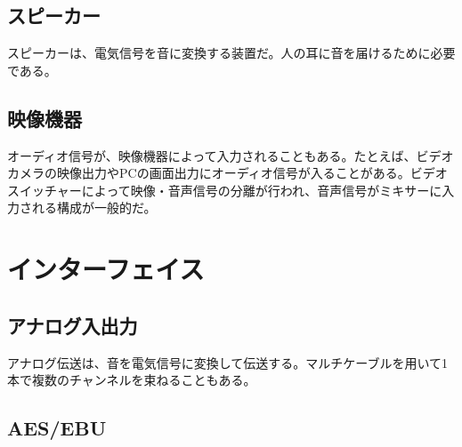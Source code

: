 \subsection{スピーカー}

スピーカーは、電気信号を音に変換する装置だ。人の耳に音を届けるために必要である。


\subsection{映像機器}

オーディオ信号が、映像機器によって入力されることもある。たとえば、ビデオカメラの映像出力やPCの画面出力にオーディオ信号が入ることがある。ビデオスイッチャーによって映像・音声信号の分離が行われ、音声信号がミキサーに入力される構成が一般的だ。


\section{インターフェイス}
\label{sec:interface}

\subsection{アナログ入出力}

アナログ伝送は、音を電気信号に変換して伝送する。マルチケーブルを用いて1本で複数のチャンネルを束ねることもある。

\subsection{AES/EBU}
\label{sec:aes/ebu}

